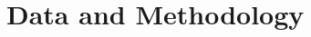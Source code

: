 \documentclass[review]{elsarticle}
\begin{document}



\section{Data and Methodology}
\end{document}
